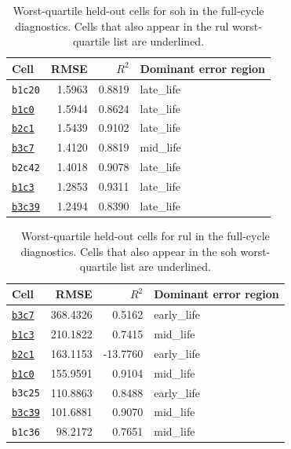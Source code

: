 \begin{table}[H]
    \centering
    \caption{Worst-quartile held-out cells for \ac{soh} in the full-cycle diagnostics. Cells that also appear in the \ac{rul} worst-quartile list are underlined.}
    \label{tab:worst_cells_soh}
    \begin{tabular}{lrrl}
    \toprule
    Cell & RMSE & $R^2$ & Dominant error region \\
    \midrule
    \texttt{b1c20} & 1.5963 & 0.8819 & late\_life \\
    \underline{\texttt{b1c0}} & 1.5944 & 0.8624 & late\_life \\
    \underline{\texttt{b2c1}} & 1.5439 & 0.9102 & late\_life \\
    \underline{\texttt{b3c7}} & 1.4120 & 0.8819 & mid\_life \\
    \texttt{b2c42} & 1.4018 & 0.9078 & late\_life \\
    \underline{\texttt{b1c3}} & 1.2853 & 0.9311 & late\_life \\
    \underline{\texttt{b3c39}} & 1.2494 & 0.8390 & late\_life \\
    \bottomrule
    \end{tabular}
\end{table}

\begin{table}[H]
    \centering
    \caption{Worst-quartile held-out cells for \ac{rul} in the full-cycle diagnostics. Cells that also appear in the \ac{soh} worst-quartile list are underlined.}
    \label{tab:worst_cells_rul}
    \begin{tabular}{lrrl}
    \toprule
    Cell & RMSE & $R^2$ & Dominant error region \\
    \midrule
    \underline{\texttt{b3c7}} & 368.4326 & 0.5162 & early\_life \\
    \underline{\texttt{b1c3}} & 210.1822 & 0.7415 & mid\_life \\
    \underline{\texttt{b2c1}} & 163.1153 & -13.7760 & early\_life \\
    \underline{\texttt{b1c0}} & 155.9591 & 0.9104 & mid\_life \\
    \texttt{b3c25} & 110.8863 & 0.8488 & early\_life \\
    \underline{\texttt{b3c39}} & 101.6881 & 0.9070 & mid\_life \\
    \texttt{b1c36} & 98.2172 & 0.7651 & mid\_life \\
    \bottomrule
    \end{tabular}
\end{table}

